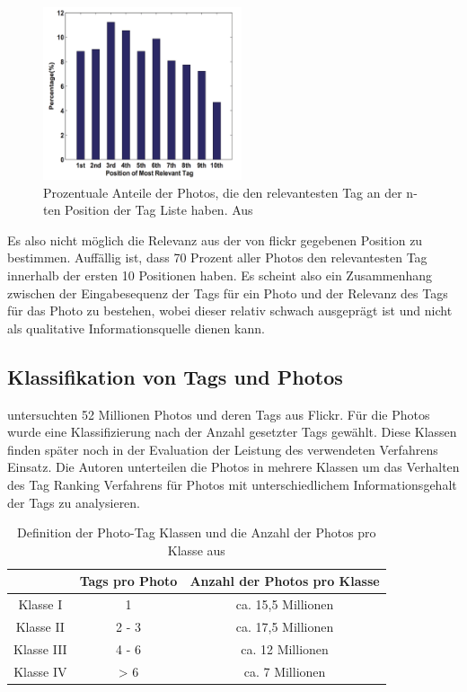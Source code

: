 \begin{figure}[htbp]
  \centering
    \includegraphics[height=2in]{images/tag_ranking_psotion_relevant_tag.png}
  \caption{Prozentuale Anteile der Photos, die den relevantesten Tag an der n-ten Position der Tag Liste haben. Aus \cite{ranking}}
  \label{fig:images_tag_ranking_psotion_relevant_tag}
\end{figure}
  
Es also nicht möglich die Relevanz aus der von flickr gegebenen Position zu bestimmen. Auffällig ist, dass 70 Prozent aller Photos den relevantesten Tag innerhalb der ersten 10 Positionen haben. Es scheint also ein Zusammenhang zwischen der Eingabesequenz der Tags für ein Photo und der Relevanz des Tags für das Photo zu bestehen, wobei dieser relativ schwach ausgeprägt ist und nicht als qualitative Informationsquelle dienen kann. 


\subsection{Klassifikation von Tags und Photos} %
\label{sub:klassifikation_von_tags}

\cite{collectiveKnowledge} untersuchten 52 Millionen Photos und deren Tags aus Flickr. Für die Photos wurde eine Klassifizierung nach der Anzahl gesetzter Tags gewählt. Diese Klassen finden später noch in der Evaluation der Leistung des verwendeten Verfahrens Einsatz. Die Autoren unterteilen die Photos in mehrere Klassen um das Verhalten des Tag Ranking Verfahrens für Photos mit unterschiedlichem Informationsgehalt der Tags zu analysieren.

\begin{table}[htbp]
\centering
\begin{tabular}{|c|c|c|} 
\hline
 & Tags pro Photo & Anzahl der Photos pro Klasse\\
\hline
Klasse I & 1 & ca. 15,5 Millionen\\
\hline
Klasse II & 2 - 3 & ca. 17,5 Millionen\\
\hline
Klasse III & 4 - 6 & ca. 12 Millionen\\
\hline
Klasse IV & > 6 & ca. 7 Millionen\\
\hline
\end{tabular}
\caption{Definition der Photo-Tag Klassen und die Anzahl der Photos pro Klasse aus \cite{collectiveKnowledge}}
\label{tab:classes_for_tags_collective}
\end{table}






